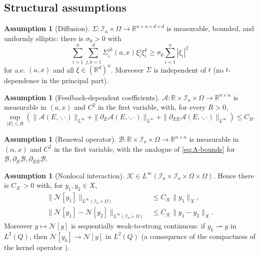 \documentclass[pdflatex,sn-mathphys-num]{sn-jnl}
\theoremstyle{plain}
\theoremstyle{definition}
\newtheorem{assumption}[theorem]{Assumption}
\theoremstyle{remark}
\newcommand{\R}{\mathbb R}
\begin{document}
\subsection{Structural assumptions}
\label{subsec:state-assumptions}
\begin{assumption}[Diffusion]
\label{ass:diffusion}
$\Sigma: \mathcal I_a\times\Omega\to\R^{n\times n\times d\times d}$ is measurable,
bounded, and uniformly elliptic: there is $\sigma_0>0$ with
\[
\sum_{i=1}^n\sum_{j,k=1}^d
\Sigma_i^{jk}(a,x)\xi_i^j\xi_i^k
\ge
\sigma_0
\sum_{i=1}^n|\xi_i|^2
\]
for a.e. $(a,x)$ and all $\xi\in(\R^d)^n$. Moreover $\Sigma$ is independent of
$t$ (no $t$-dependence in the principal part).
\end{assumption}

\begin{assumption}[Feedback-dependent coefficients]
\label{ass:feedback-coefficients}
$\mathcal A:\R\times \mathcal I_a\times\Omega\to\R^{n\times n}$ is measurable in $(a,x)$ and
$C^2$ in the first variable, with, for every $R>0$,
\begin{equation}
\label{eq:A-bounds}
\sup_{|E|\le R}
\left(
\|\mathcal A(E,\cdot,\cdot)\|_{L^\infty}
+
\|\partial_E \mathcal A(E,\cdot,\cdot)\|_{L^\infty}
+
\|\partial_{EE}\mathcal A(E,\cdot,\cdot)\|_{L^\infty}
\right)
\le C_R .
\end{equation}
\end{assumption}

\begin{assumption}[Renewal operator]
\label{ass:renewal}
$\mathcal B:\R\times \mathcal I_a\times\Omega\to\R^{n\times n}$ is measurable in $(\alpha,x)$ and
$C^2$ in the first variable, with the analogue of \eqref{eq:A-bounds} for
$\mathcal B,\partial_E \mathcal B,\partial_{EE}\mathcal B$.
\end{assumption}

\begin{assumption}[Nonlocal interaction]
\label{ass:nonlocal}
$\mathscr K\in L^\infty(\mathcal I_a\times \mathcal I_a\times\Omega\times\Omega)$. Hence there
is $C_{\mathscr K}>0$ with, for $y_1,y_2\in X$,
\[
\begin{aligned}
\|\mathcal N[y_1]\|_{L^\infty(\mathcal I_a\times\Omega)}
&\le
C_{\mathscr K}\|y_1\|_X,
\\
\|\mathcal N[y_1]-\mathcal N[y_2]\|_{L^\infty(\mathcal I_a\times\Omega)}
&\le
C_{\mathscr K}\|y_1-y_2\|_X .
\end{aligned}
\]
Moreover $y\mapsto\mathcal N[y]$ is sequentially weak-to-strong continuous: if
$y_k\rightharpoonup y$ in $L^2(Q)$, then $\mathcal N[y_k]\to\mathcal N[y]$ in
$L^2(Q)$ (a consequence of the compactness of the kernel operator
\cite{brezis2011functional,gao2022rolling}).
\end{assumption}
\end{document}
